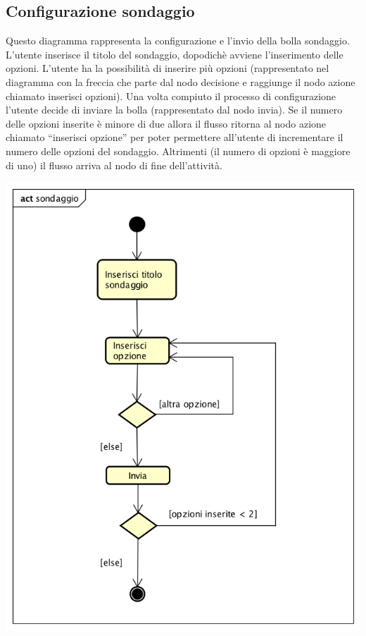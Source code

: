 \subsection{Configurazione sondaggio}
Questo diagramma rappresenta la configurazione e l'invio della bolla sondaggio. L’utente inserisce il titolo del sondaggio, dopodichè avviene l’inserimento delle opzioni. L’utente ha la possibilità di inserire più opzioni (rappresentato nel diagramma con la freccia che parte dal nodo decisione e raggiunge il nodo azione chiamato inserisci opzioni). Una volta compiuto il processo di configurazione l’utente decide di inviare la bolla (rappresentato dal nodo invia). Se il numero delle opzioni inserite è minore di due allora il flusso ritorna al nodo azione chiamato “inserisci opzione” per poter permettere all’utente di incrementare il numero delle opzioni del sondaggio. Altrimenti (il numero di opzioni è maggiore di uno) il flusso arriva al nodo di fine dell’attività.
\begin{center}
  \includegraphics[scale=0.5]{img/Sondaggio.png}
\end{center}




